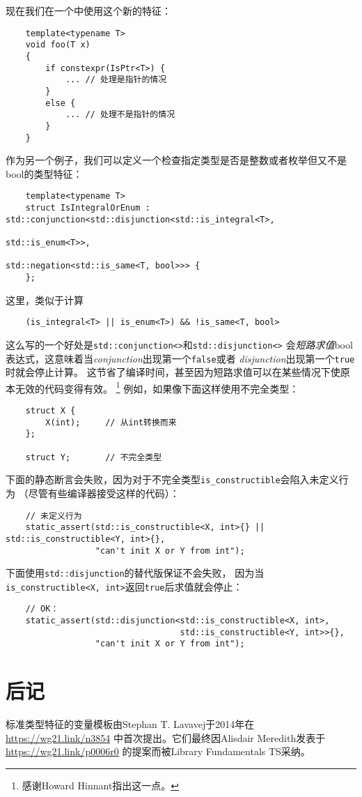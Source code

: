 现在我们在一个中使用这个新的特征：
\begin{lstlisting}
    template<typename T>
    void foo(T x)
    {
        if constexpr(IsPtr<T>) {
            ... // 处理是指针的情况
        }
        else {
            ... // 处理不是指针的情况
        }
    }
\end{lstlisting}
作为另一个例子，我们可以定义一个检查指定类型是否是整数或者枚举但又不是bool的类型特征：
\begin{lstlisting}
    template<typename T>
    struct IsIntegralOrEnum : std::conjunction<std::disjunction<std::is_integral<T>,
                                                                std::is_enum<T>>,
                                               std::negation<std::is_same<T, bool>>> {
    };
\end{lstlisting}
这里，类似于计算
\begin{lstlisting}
    (is_integral<T> || is_enum<T>) && !is_same<T, bool>
\end{lstlisting}
这么写的一个好处是\texttt{std::conjunction<>}和\texttt{std::disjunction<>}
会\emph{短路求值}bool表达式，这意味着当\emph{conjunction}出现第一个\texttt{false}或者
\emph{disjunction}出现第一个\texttt{true}时就会停止计算。
这节省了编译时间，甚至因为短路求值可以在某些情况下使原本无效的代码变得有效。
\footnote{感谢Howard Hinnant指出这一点。}
例如，如果像下面这样使用不完全类型：
\begin{lstlisting}
    struct X {
        X(int);     // 从int转换而来
    };

    struct Y;       // 不完全类型
\end{lstlisting}
下面的静态断言会失败，因为对于不完全类型\texttt{is\_constructible}会陷入未定义行为
（尽管有些编译器接受这样的代码）：
\begin{lstlisting}
    // 未定义行为
    static_assert(std::is_constructible<X, int>{} || std::is_constructible<Y, int>{},
                  "can't init X or Y from int");
\end{lstlisting}
下面使用\texttt{std::disjunction}的替代版保证不会失败，
因为当\texttt{is\_constructible<X, int>}返回\texttt{true}后求值就会停止：
\begin{lstlisting}
    // OK：
    static_assert(std::disjunction<std::is_constructible<X, int>,
                                   std::is_constructible<Y, int>>{},
                  "can't init X or Y from int");
\end{lstlisting}


\section{后记}
标准类型特征的变量模板由Stephan T. Lavavej于2014年在\url{https://wg21.link/n3854}
中首次提出。它们最终因Alisdair Meredith发表于\url{https://wg21.link/p0006r0}
的提案而被Library Fundamentals TS采纳。

